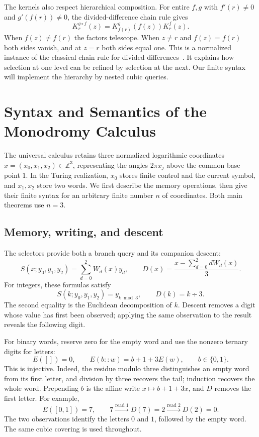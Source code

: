 \documentclass[11pt]{article}
\numberwithin{equation}{section}
\theoremstyle{definition}
\theoremstyle{remark}
\newcommand{\Z}{\mathbb Z}
\begin{document}
The kernels also respect hierarchical composition. For entire $f,g$
with $f'(r)\ne0$ and $g'(f(r))\ne0$, the divided-difference chain rule gives
\begin{equation}\label{eq:kernel-composition}
 K_r^{g\circ f}(z)=K_{f(r)}^g(f(z))K_r^f(z).
\end{equation}
When $f(z)\ne f(r)$ the factors telescope. When $z\ne r$ and
$f(z)=f(r)$ both sides vanish, and at $z=r$ both sides equal one.
This is a normalized instance of the classical chain
rule for divided differences~\cite{floaterLyche2007}. It explains how
selection at one level can be refined by selection at the next. Our
finite syntax will implement the hierarchy by nested cubic queries.

\section{Syntax and Semantics of the Monodromy Calculus}
\label{sec:model}

The universal calculus retains three normalized logarithmic coordinates
$x=(x_0,x_1,x_2)\in\Z^3$, representing the angles $2\pi x_j$ above
the common base point $1$. In the Turing realization, $x_0$ stores
finite control and the current symbol, and $x_1,x_2$ store two words.
We first describe the memory operations, then give their finite syntax
for an arbitrary finite number $n$ of coordinates. Both main theorems
use $n=3$.

\subsection{Memory, writing, and descent}

The selectors provide both a branch query and its companion descent:
\begin{equation}\label{eq:select-descent}
 S(x;y_0,y_1,y_2)=\sum_{d=0}^2W_d(x)y_d,
 \qquad
 D(x)=\frac{x-\sum_{d=0}^2 dW_d(x)}3.
\end{equation}
For integers, these formulas satisfy
\begin{equation}\label{eq:select-descent-int}
 S(k;y_0,y_1,y_2)=y_{k\bmod3},\qquad D(k)=k\div3.
\end{equation}
The second equality is the Euclidean decomposition of $k$. Descent
removes a digit whose value has first been observed; applying the same
observation to the result reveals the following digit.

For binary words, reserve zero for the empty word and use the nonzero
ternary digits for letters:
\begin{equation}\label{eq:binary-code}
 E([])=0,\qquad E(b::w)=b+1+3E(w),\qquad b\in\{0,1\}.
\end{equation}
This is injective. Indeed, the residue modulo three distinguishes an
empty word from its first letter, and division by three recovers the
tail; induction recovers the whole word. Prepending $b$ is the affine
write $x\mapsto b+1+3x$, and $D$ removes the first letter.
For example,
\[
 E([0,1])=7,\qquad 7\xrightarrow{\text{read }1}D(7)=2
 \xrightarrow{\text{read }2}D(2)=0.
\]
The two observations identify the letters $0$ and $1$, followed by the
empty word. The same cubic covering is used throughout.
\end{document}
